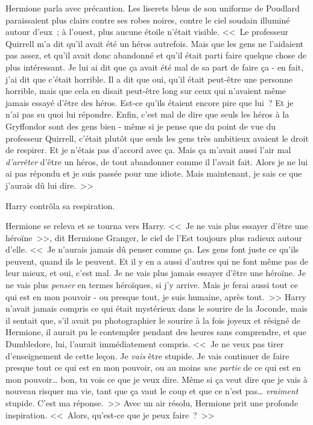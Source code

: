 Hermione parla avec précaution. Les liserets bleus de son uniforme de Poudlard paraissaient plus clairs contre ses robes noires, contre le ciel soudain illuminé autour d'eux~; à l'ouest, plus aucune étoile n'était visible. <<~Le professeur Quirrell m'a dit qu'il avait été un héros autrefois. Mais que les gens ne l'aidaient pas assez, et qu'il avait donc abandonné et qu'il était parti faire quelque chose de plus intéressant. Je lui ai dit que ça avait été mal de sa part de faire ça - en fait, j'ai dit que c'était horrible. Il a dit que oui, qu'il était peut-être une personne horrible, mais que cela en disait peut-être long sur ceux qui n'avaient même jamais essayé d'être des héros. Est-ce qu'ils étaient encore pire que lui~? Et je n'ai pas su quoi lui répondre. Enfin, c'est mal de dire que seuls les héros à la Gryffondor sont des gens bien - même si je pense que du point de vue du professeur Quirrell, c'était plutôt que seuls les gens très ambitieux avaient le droit de respirer. Et je n'étais pas d'accord avec ça. Mais ça m'avait aussi l'air mal \emph{d'arrêter} d'être un héros, de tout abandonner comme il l'avait fait. Alors je ne lui ai pas répondu et je suis passée pour une idiote. Mais maintenant, je sais ce que j'aurais dû lui dire.~>>

Harry contrôla sa respiration.

Hermione se releva et se tourna vers Harry. <<~Je ne vais plus essayer d'être une héroïne~>>, dit Hermione Granger, le ciel de l'Est toujours plus radieux autour d'elle. <<~Je n'aurais jamais dû penser comme ça. Les gens font juste ce qu'ils peuvent, quand ils le peuvent. Et il y en a aussi d'autres qui ne font même pas de leur mieux, et oui, c'est mal. Je ne vais plus jamais essayer d'être une héroïne. Je ne vais plus \emph{penser} en termes héroïques, si j'y arrive. Mais je ferai aussi tout ce qui est en mon pouvoir - ou presque tout, je suis humaine, après tout.~>> Harry n'avait jamais compris ce qui était mystérieux dans le sourire de la Joconde, mais il sentait que, s'il avait pu photographier le sourire à la fois joyeux et résigné de Hermione, il aurait pu le contempler pendant des heures sans comprendre, et que Dumbledore, lui, l'aurait immédiatement compris. <<~Je ne veux pas tirer d'enseignement de cette leçon. Je \emph{vais} être stupide. Je vais continuer de faire presque tout ce qui est en mon pouvoir, ou au moins \emph{une partie} de ce qui est en mon pouvoir… bon, tu vois ce que je veux dire. Même si ça veut dire que je vais à nouveau risquer ma vie, tant que ça vaut le coup et que ce n'est pas… \emph{vraiment} stupide. C'est ma réponse.~>> Avec un air résolu, Hermione prit une profonde inspiration. <<~Alors, qu'est-ce que je peux faire~?~>>

